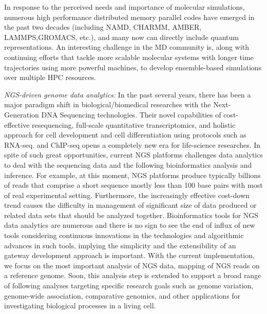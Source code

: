 \documentclass{sig-alternate}
\begin{document}

In response to the perceived needs and importance of molecular
simulations, numerous high performance distributed memory parallel
codes have emerged in the past two decades (including NAMD, CHARMM,
AMBER, LAMMPS,GROMACS, etc.), and many now can directly include
quantum representations.  An interesting challenge in the MD community
is, along with continuing efforts that tackle more scalable molecular
systems with longer time trajectories using more powerful machines, to
develop ensemble-based simulations over multiple HPC resources.

\textit{NGS-driven genome data analytics:} In the past several years,
there has been a major paradigm shift in biological/biomedical
researches with the Next-Generation DNA Sequencing
technologies\cite{mardis2008-tig,metzker2010,mardis2008-arghg}.  Their
novel capabilities of cost-effective resequencing, full-scale
quantitative transcriptomics, and holistic approach for cell
development and cell differentiation using protocols such as
RNA-seq. and ChIP-seq opens a completely new era for life-science
researches\cite{sorek2010,mortazavi2008}.  In spite of such great
opportunities, current NGS platforms challenges data analytics to deal
with the sequencing data and the following bioinformatics analysis and
inference.  For example, at this moment, NGS platforms produce
typically billions of reads that comprise a short sequence mostly less
than 100 base pairs with most of real experimental
setting\cite{alex2009,trapnell2009}.  Furthermore, the increasingly
effective cost-down trend causes the difficulty in management of
significant size of data produced or related data sets that should be
analyzed together.  Bioinformatics tools for NGS data analytics are
numerous and there is no sign to see the end of influx of new tools
considering continuous innovations in the technologies and algorithmic
advances in such tools, implying the simplicity and the extensibility
of an gateway development approach is important.  With the current
implementation, we focus on the most important analysis of NGS data,
mapping of NGS reads on a reference genome.  Soon, this analysis step
is extended to support a broad range of following analyses targeting
specific research goals such as genome variation, genome-wide
association, comparative genomics, and other applications for
investigating biological processes in a living cell.
\end{document}

